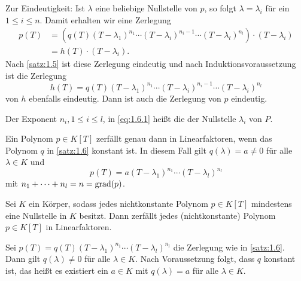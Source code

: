 \begin{beweis}
\begin{description}
		Zur Eindeutigkeit:
		Ist $\lambda$ eine beliebige Nullstelle von $p$, so folgt $\lambda = \lambda_i$ für ein $1 \leq i \leq n$.
		Damit erhalten wir eine Zerlegung
		\begin{align*}
			p(T) &= (q(T) (T-\lambda_1)^{n_1} \cdots (T-\lambda_i)^{n_i-1} \cdots (T-\lambda_l)^{n_l})\cdot (T-\lambda_i) \\
			&= h(T) \cdot (T-\lambda_i).
		\end{align*}
		Nach \autoref{satz:1.5} ist diese Zerlegung eindeutig und nach Induktionsvoraussetzung ist die Zerlegung
		\[
			h(T) = q(T) (T-\lambda_1)^{n_1} \cdots (T-\lambda_i)^{n_i-1} \cdots (T-\lambda_i)^{n_l}
		\]
		von $h$ ebenfalls eindeutig.
		Dann ist auch die Zerlegung von $p$ eindeutig. \qedhere
	\end{description}
\end{beweis}

\begin{definition}
	\label{def:1.7}
	Der Exponent $n_i, 1 \leq i \leq l$, in \eqref{eq:1.6.1} heißt die  der Nullstelle $\lambda_i$ von $P$.
\end{definition}

\begin{bemerkung}
	\label{bem:1.8}
	Ein Polynom $p \in K[T]$ zerfällt genau dann in Linearfaktoren, wenn das Polynom $q$ in \autoref{satz:1.6} konstant ist.
	In diesem Fall gilt $q(\lambda) = a \neq 0$ für alle $\lambda \in K$ und
	\[
		p(T) = a(T-\lambda_1)^{n_1} \cdots (T-\lambda_l)^{n_l}
	\]
	mit $n_1+\cdots+n_l = n = \operatorname{grad}(p)$.
\end{bemerkung}

\begin{korollar}
	\label{kor:1.9}
	Sei $K$ ein Körper, sodass jedes nichtkonstante Polynom $p \in K[T]$ mindestens eine Nullstelle in $K$ besitzt.
	Dann zerfällt jedes (nichtkonstante) Polynom $p \in K[T]$ in Linearfaktoren.
\end{korollar}

\begin{beweis}
	Sei $p(T) = q(T)(T-\lambda_1)^{n_1} \cdots (T-\lambda_l)^{n_l}$ die Zerlegung wie in \autoref{satz:1.6}.
	Dann gilt $q(\lambda) \neq 0$ für alle $\lambda \in K$.
	Nach Voraussetzung folgt, dass $q$ konstant ist, das heißt es existiert ein $a \in K$ mit $q(\lambda) = a$ für alle $\lambda \in K$. \qedhere
\end{beweis}

